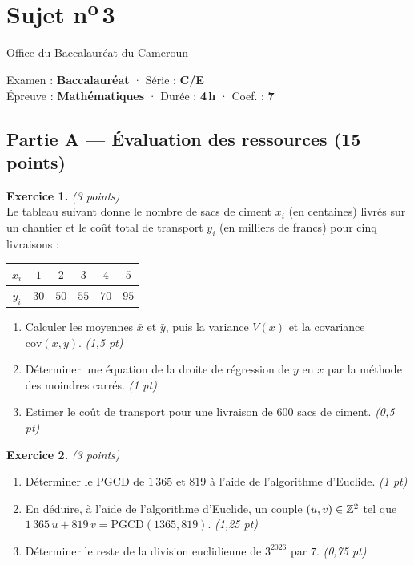 \section{Sujet n\textsuperscript{o}\,3}
\noindent\begin{minipage}{0.5\linewidth}\footnotesize Office du Baccalauréat du Cameroun\end{minipage}%
\hfill\begin{minipage}{0.45\linewidth}\footnotesize\raggedleft Examen : \textbf{Baccalauréat} · Série : \textbf{C/E}\\
Épreuve : \textbf{Mathématiques} · Durée : \textbf{4\,h} · Coef. : \textbf{7}\end{minipage}
\par\smallskip{\color{onbo}\rule{\linewidth}{1pt}}

\subsection*{Partie A — Évaluation des ressources \hfill (15 points)}

\noindent\textbf{Exercice 1.} \hfill\textit{(3 points)}\\
Le tableau suivant donne le nombre de sacs de ciment $x_i$ (en centaines) livrés sur un chantier
et le coût total de transport $y_i$ (en milliers de francs) pour cinq livraisons :
\par\smallskip
\begin{center}\footnotesize
\begin{tabular}{|c|c|c|c|c|c|}\hline
$x_i$ & $1$ & $2$ & $3$ & $4$ & $5$\\\hline
$y_i$ & $30$ & $50$ & $55$ & $70$ & $95$\\\hline
\end{tabular}
\end{center}
\begin{enumerate}[label=\arabic*)]
\item Calculer les moyennes $\bar x$ et $\bar y$, puis la variance $V(x)$ et la covariance $\mathrm{cov}(x,y)$. \hfill\textit{(1,5 pt)}
\item Déterminer une équation de la droite de régression de $y$ en $x$ par la méthode des moindres carrés. \hfill\textit{(1 pt)}
\item Estimer le coût de transport pour une livraison de $600$ sacs de ciment. \hfill\textit{(0,5 pt)}
\end{enumerate}

\smallskip
\noindent\textbf{Exercice 2.} \hfill\textit{(3 points)}\\
\begin{enumerate}[label=\arabic*)]
\item Déterminer le PGCD de $1\,365$ et $819$ à l'aide de l'algorithme d'Euclide. \hfill\textit{(1 pt)}
\item En déduire, à l'aide de l'algorithme d'Euclide, un couple $(u,v)\in\mathbb{Z}^2$ tel que
$1\,365\,u+819\,v=\mathrm{PGCD}(1365,819)$. \hfill\textit{(1,25 pt)}
\item Déterminer le reste de la division euclidienne de $3^{2026}$ par $7$. \hfill\textit{(0,75 pt)}
\end{enumerate}

